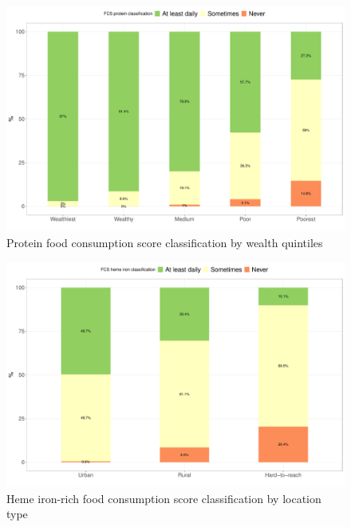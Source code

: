 \documentclass[12pt,a4paper]{article}
\begin{document}
\begin{figure}[H]

{\centering \includegraphics{kayahReport_files/figure-latex/fcsn4plot-1} 

}

\caption{Protein food consumption score classification by wealth quintiles}\label{fig:fcsn4plot}
\end{figure}

\begin{figure}[H]

{\centering \includegraphics{kayahReport_files/figure-latex/fcsn5plot-1} 

}

\caption{Heme iron-rich food consumption score classification by location type}\label{fig:fcsn5plot}
\end{figure}
\end{document}
